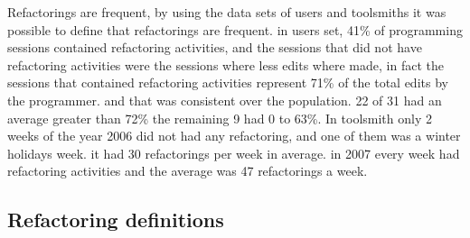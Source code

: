 Refactorings are frequent, by using the data sets of users and toolsmiths it was possible to define that refactorings are frequent. in users set, 41\% of programming sessions contained refactoring activities, and the sessions that did not have refactoring activities were the sessions where less edits where made, in fact the sessions that contained refactoring activities represent 71\% of the total edits by the programmer. and that was consistent over the population. 22 of 31 had an average greater than 72\% the remaining 9 had 0 to 63\%. 
In toolsmith only 2 weeks of the year 2006 did not had any refactoring, and one of them was a winter holidays week. it had 30 refactorings per week in average. in 2007 every week had refactoring activities and the average was 47 refactorings a week.





\subsection{Refactoring definitions}

